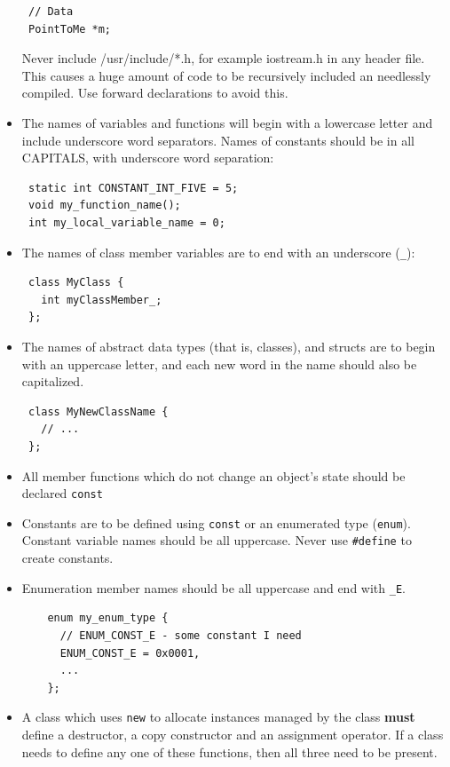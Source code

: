 \documentclass[fleqn,12pt,openany]{book}
\begin{document}
\begin{itemize}
\begin{verbatim}
 // Data
 PointToMe *m;
\end{verbatim}

Never include /usr/include/*.h, for example iostream.h in any header file.
This causes a huge amount of code to be recursively included an
needlessly compiled.
Use forward declarations to avoid this.

\item
The names of variables and functions will begin with a lowercase letter and
include underscore word separators.
Names of constants should be in all CAPITALS, with underscore word separation:

\begin{verbatim}
 static int CONSTANT_INT_FIVE = 5;
 void my_function_name();
 int my_local_variable_name = 0;
\end{verbatim}

\item
The names of class member variables are to end with an underscore (\texttt{\_}):

\begin{verbatim}
 class MyClass {
   int myClassMember_;
 };
\end{verbatim}

\item
The names of abstract data types (that is, classes), and structs are to begin
with an uppercase letter, and each new word in the name should also be capitalized.

\begin{verbatim}
 class MyNewClassName {
   // ...
 };
\end{verbatim}

\item
All member functions which do not change an object's state should be declared \texttt{const}

\item
Constants are to be defined using \texttt{const} or an enumerated type (\texttt{enum}).
Constant variable names should be all uppercase.
Never use \texttt{\#define} to create constants.

\item
Enumeration member names should be all uppercase and end with \texttt{\_E}.
\begin{verbatim}
    enum my_enum_type {
      // ENUM_CONST_E - some constant I need
      ENUM_CONST_E = 0x0001,
      ...
    };
\end{verbatim}

\item
A class which uses \texttt{new} to allocate instances managed by the class
\textbf{must} define a destructor, a copy constructor and an assignment operator.
If a class needs to define any one of these functions, then all three need to be
present.


\end{itemize}
\end{document}
